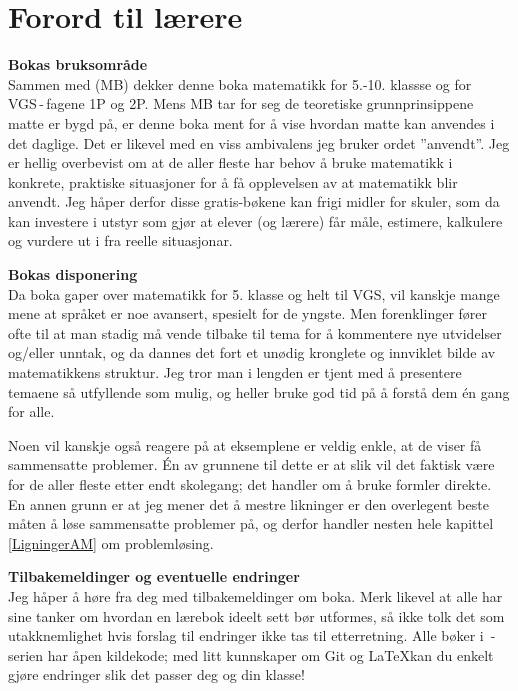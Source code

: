 


\newpage
\section*{Forord til lærere}
\textbf{Bokas bruksområde}\\
Sammen med  (MB) dekker denne boka matematikk for 5.-10. klassse og for VGS\,-\,fagene 1P og 2P. Mens MB tar for seg de teoretiske grunnprinsippene matte er bygd på, er denne boka ment for å vise hvordan matte kan anvendes i det daglige. Det er likevel med en viss ambivalens jeg bruker ordet ''anvendt''. Jeg er hellig overbevist om at de aller fleste har behov å bruke matematikk i konkrete, praktiske situasjoner for å få opplevelsen av at matematikk blir anvendt. Jeg håper derfor disse gratis-bøkene kan frigi midler for skuler, som da kan investere i utstyr som gjør at elever (og lærere) får måle, estimere, kalkulere og vurdere ut i fra reelle situasjonar.\vsk

\textbf{Bokas disponering} \\
Da boka gaper over matematikk for 5. klasse og helt til VGS, vil kanskje mange mene at språket er noe avansert, spesielt for de yngste. Men forenklinger fører ofte til at man stadig må vende tilbake til tema for å kommentere nye utvidelser og/eller unntak, og da dannes det fort et unødig kronglete og innviklet bilde av matematikkens struktur. Jeg tror man i lengden er tjent med å presentere temaene så utfyllende som mulig, og heller bruke god tid på å forstå dem én gang for alle.\vsk

Noen vil kanskje også reagere på at eksemplene er veldig enkle, at de viser få sammensatte problemer. Én av grunnene til dette er at slik vil det faktisk være for de aller fleste etter endt skolegang; det handler om å bruke formler direkte. En annen grunn er at jeg mener det å mestre likninger er den overlegent beste måten å løse sammensatte problemer på, og derfor handler nesten hele kapittel \ref{LigningerAM} om problemløsing.\vsk

\textbf{Tilbakemeldinger og eventuelle endringer} \\
Jeg håper å høre fra deg med tilbakemeldinger om boka. Merk likevel at alle har sine tanker om hvordan en lærebok ideelt sett bør utformes, så ikke tolk det som utakknemlighet hvis forslag til endringer ikke tas til etterretning. Alle bøker i \openmath\,-serien har åpen kildekode; med litt kunnskaper om Git og \LaTeX\;kan du enkelt gjøre endringer slik det passer deg og din klasse!


